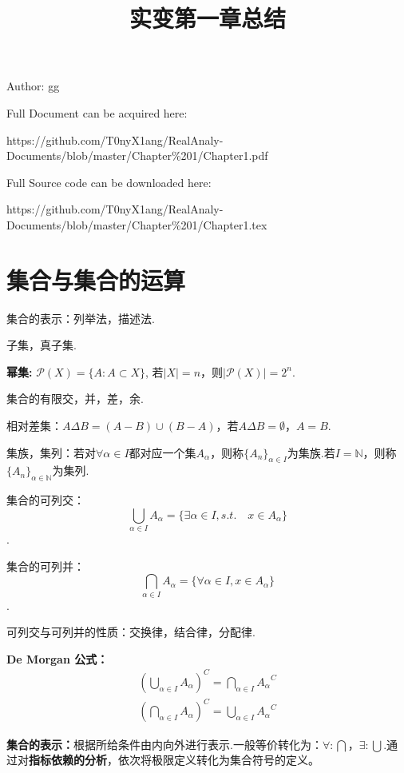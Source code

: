\documentclass[bwprint, withoutpreface]{cumcmthesis}
\title{实变第一章总结}
\begin{document}
\maketitle
\noindent Author: gg

\noindent Full Document can be acquired here: 

\noindent https://github.com/T0nyX1ang/RealAnaly-Documents/blob/master/Chapter\%201/Chapter1.pdf

\noindent Full Source code can be downloaded here:

\noindent https://github.com/T0nyX1ang/RealAnaly-Documents/blob/master/Chapter\%201/Chapter1.tex

\section{集合与集合的运算}
\indent 集合的表示：列举法，描述法.

子集，真子集.

\textbf{幂集:} $\mathcal{P}(X) = \{A:A \subset X\}$, 若$|X|=n$，则$|\mathcal{P}(X)|=2^n$.

集合的有限交，并，差，余.

相对差集：$A \Delta B = (A - B) \cup (B - A)$，若$A \Delta B = \emptyset$，$A = B$.

集族，集列：若对$\forall \alpha \in I$都对应一个集$A_{\alpha}$，则称$\{A_n\}_{\alpha \in I}$为集族.若$I = \mathbb{N}$，则称$\{A_n\}_{\alpha \in \mathbb{N}}$为集列.

集合的可列交：
\begin{equation*}
	\bigcup_{\alpha \in I}{A_\alpha} = \{\exists \alpha \in I, s.t. \quad x \in A_{\alpha}\}
\end{equation*}.

集合的可列并：
\begin{equation*}
	\bigcap_{\alpha \in I}{A_\alpha} = \{\forall \alpha \in I, x \in A_{\alpha}\}
\end{equation*}.

可列交与可列并的性质：交换律，结合律，分配律.

\textbf{De Morgan 公式：}
\begin{align*}
	{(\bigcup_{\alpha \in I}{A_{\alpha}})}^C = \bigcap_{\alpha \in I}{{A_{\alpha}}^C} \\ 
	{(\bigcap_{\alpha \in I}{A_{\alpha}})}^C = \bigcup_{\alpha \in I}{{A_{\alpha}}^C}
\end{align*}

\textbf{集合的表示：}根据所给条件由内向外进行表示.一般等价转化为：$\forall: \bigcap$，$\exists: \bigcup$.通过对\textbf{指标依赖的分析}，依次将极限定义转化为集合符号的定义。
\end{document}
